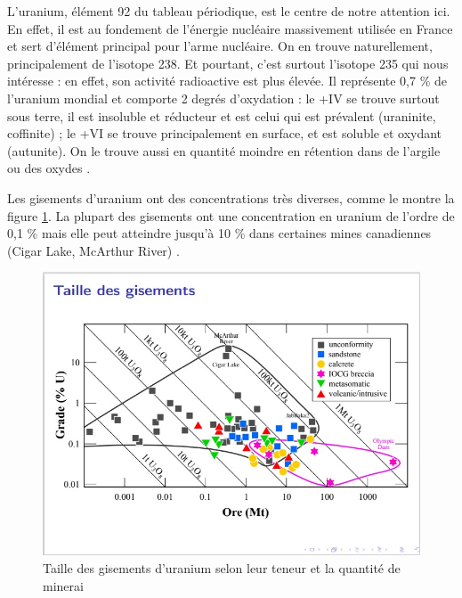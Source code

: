 \documentclass{article}
\begin{document}
L’uranium, élément 92 du tableau périodique, est le centre de notre attention ici. En effet, il est au fondement de l’énergie nucléaire massivement utilisée en France et sert d’élément principal pour l’arme nucléaire. On en trouve naturellement, principalement de l’isotope 238. Et pourtant, c’est surtout l’isotope 235 qui nous intéresse : en effet, son activité radioactive est plus élevée. Il représente 0,7 \% de l’uranium mondial et comporte 2 degrés d’oxydation : le +IV se trouve surtout sous terre, il est insoluble et réducteur et est celui qui est prévalent (uraninite, coffinite) ; le +VI se trouve principalement en surface, et est soluble et oxydant (autunite). On le trouve aussi en quantité moindre en rétention dans de l’argile ou des oxydes \cite{descostes_introduction_2020}.

Les gisements d’uranium ont des concentrations très diverses, comme le montre la figure \ref{fig:gisements_uranium}. La plupart des gisements ont une concentration en uranium de l’ordre de 0,1 \% mais elle peut atteindre jusqu’à 10 \% dans certaines mines canadiennes (Cigar Lake, McArthur River) \cite{raimbault_mine_2020}.


\begin{figure}[!h]
    \centering
    \includegraphics[width = \linewidth]{I_A_1.jpg}
    \caption{Taille des gisements d'uranium selon leur teneur et la quantité de minerai \cite{raimbault_mine_2020}}
    \label{fig:gisements_uranium}
\end{figure}
\end{document}
